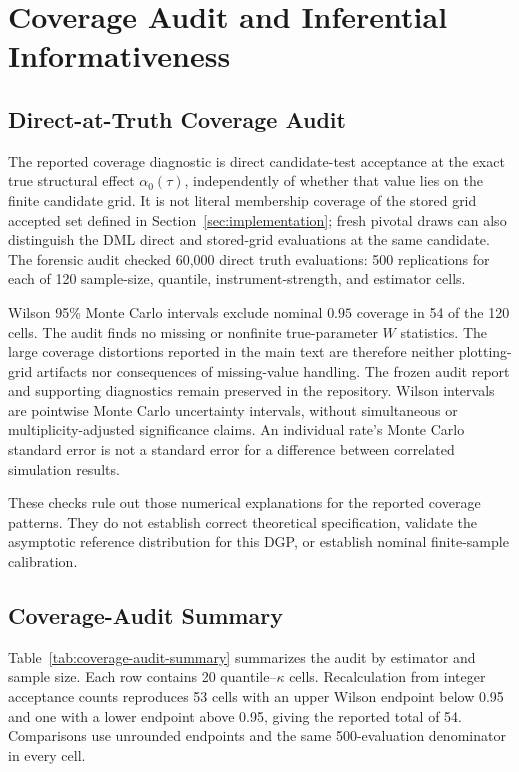 \section{Coverage Audit and Inferential Informativeness}
\setcounter{equation}{0}\setcounter{table}{0}\setcounter{figure}{0}
\label{app:coverage-forensic-audit}

\subsection{Direct-at-Truth Coverage Audit}

The reported coverage diagnostic is direct candidate-test acceptance at the exact true structural effect $\alpha_0(\tau)$, independently of whether that value lies on the finite candidate grid. It is not literal membership coverage of the stored grid accepted set defined in Section~\ref{sec:implementation}; fresh pivotal draws can also distinguish the DML direct and stored-grid evaluations at the same candidate. The forensic audit checked 60,000 direct truth evaluations: 500 replications for each of 120 sample-size, quantile, instrument-strength, and estimator cells.

Wilson 95\% Monte Carlo intervals exclude nominal $0.95$ coverage in 54 of the 120 cells. The audit finds no missing or nonfinite true-parameter $W$ statistics. The large coverage distortions reported in the main text are therefore neither plotting-grid artifacts nor consequences of missing-value handling. The frozen audit report and supporting diagnostics remain preserved in the repository. Wilson intervals are pointwise Monte Carlo uncertainty intervals, without simultaneous or multiplicity-adjusted significance claims. An individual rate's Monte Carlo standard error is not a standard error for a difference between correlated simulation results.

These checks rule out those numerical explanations for the reported coverage patterns. They do not establish correct theoretical specification, validate the asymptotic reference distribution for this DGP, or establish nominal finite-sample calibration.

\subsection{Coverage-Audit Summary}

Table~\ref{tab:coverage-audit-summary} summarizes the audit by estimator and sample size. Each row contains 20 quantile--$\kappa$ cells. Recalculation from integer acceptance counts reproduces 53 cells with an upper Wilson endpoint below 0.95 and one with a lower endpoint above 0.95, giving the reported total of 54. Comparisons use unrounded endpoints and the same 500-evaluation denominator in every cell.

